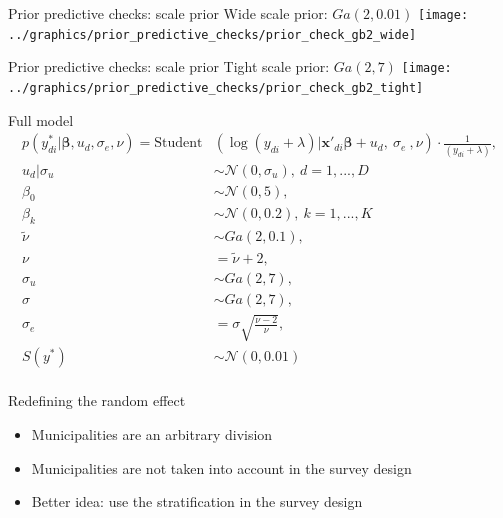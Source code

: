 \begin{frame}{Prior predictive checks: scale prior}
    \centering
    Wide scale prior: $Ga(2, 0.01)$
    \texttt{[image: ../graphics/prior\_predictive\_checks/prior\_check\_gb2\_wide]}
\end{frame}

\begin{frame}{Prior predictive checks: scale prior}
    \centering
    Tight scale prior: $Ga(2, 7)$
    \texttt{[image: ../graphics/prior\_predictive\_checks/prior\_check\_gb2\_tight]}
\end{frame}

\begin{frame}{Full model}
    \vspace{-0.5cm}
    \begin{equation*}
        \begin{split}
            p(y_{di}^* |\boldsymbol \beta, u_d, \sigma_e, \nu)   = \text{Student}&(\log(y_{di} + \lambda)| \boldsymbol{x'}_{di} \boldsymbol \beta + u_d,\ \sigma_e\ , \nu)\cdot \frac 1 {(y_{di} + \lambda)}, \\
            u_d | \sigma_u & \sim \mathcal N(0, \sigma_u),\ d = 1, ..., D \\
            \beta_0 & \sim \mathcal N (0, 5),\\
            \beta_k & \sim \mathcal N(0, 0.2),\ k = 1, ..., K\\
            \tilde \nu & \sim Ga(2, 0.1), \\
            \nu & = \tilde \nu + 2,\\
            \sigma_u & \sim Ga(2, 7), \\
            \sigma & \sim Ga(2, 7), \\
            \sigma_e & = \sigma \sqrt{\frac{\nu - 2}{\nu}},\\
            S(y^*) & \sim \mathcal N(0, 0.01)\\
        \end{split}
        \label{eq:trafo_coef_var}
    \end{equation*}
\end{frame}

\begin{frame}{Redefining the random effect}
    \begin{itemize}
        \item Municipalities are an arbitrary division
        \item Municipalities are not taken into account in the survey design
        \item Better idea: use the stratification in the survey design
    \end{itemize}
\end{frame}

